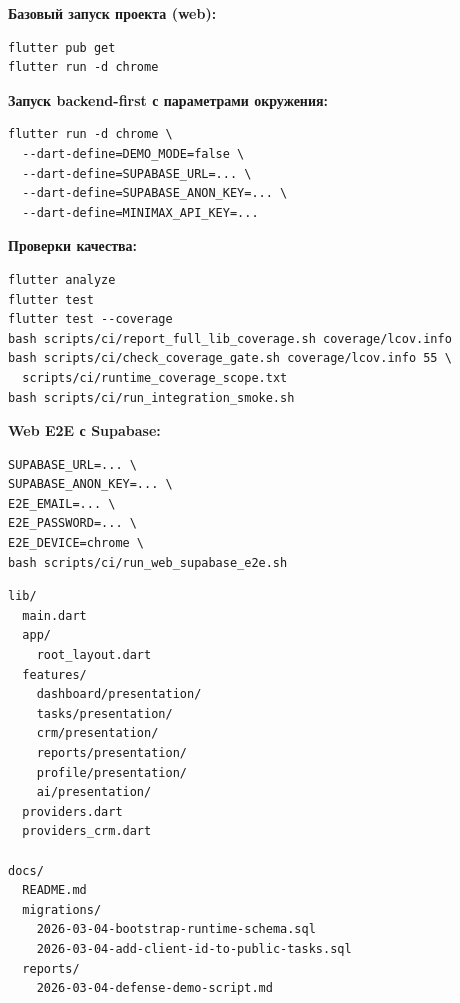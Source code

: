 
\textbf{Базовый запуск проекта (web):}
\begin{verbatim}
flutter pub get
flutter run -d chrome
\end{verbatim}

\textbf{Запуск backend-first с параметрами окружения:}
\begin{verbatim}
flutter run -d chrome \
  --dart-define=DEMO_MODE=false \
  --dart-define=SUPABASE_URL=... \
  --dart-define=SUPABASE_ANON_KEY=... \
  --dart-define=MINIMAX_API_KEY=...
\end{verbatim}

\textbf{Проверки качества:}
\begin{verbatim}
flutter analyze
flutter test
flutter test --coverage
bash scripts/ci/report_full_lib_coverage.sh coverage/lcov.info
bash scripts/ci/check_coverage_gate.sh coverage/lcov.info 55 \
  scripts/ci/runtime_coverage_scope.txt
bash scripts/ci/run_integration_smoke.sh
\end{verbatim}

\textbf{Web E2E с Supabase:}
\begin{verbatim}
SUPABASE_URL=... \
SUPABASE_ANON_KEY=... \
E2E_EMAIL=... \
E2E_PASSWORD=... \
E2E_DEVICE=chrome \
bash scripts/ci/run_web_supabase_e2e.sh
\end{verbatim}


\begin{verbatim}
lib/
  main.dart
  app/
    root_layout.dart
  features/
    dashboard/presentation/
    tasks/presentation/
    crm/presentation/
    reports/presentation/
    profile/presentation/
    ai/presentation/
  providers.dart
  providers_crm.dart

docs/
  README.md
  migrations/
    2026-03-04-bootstrap-runtime-schema.sql
    2026-03-04-add-client-id-to-public-tasks.sql
  reports/
    2026-03-04-defense-demo-script.md
\end{verbatim}


